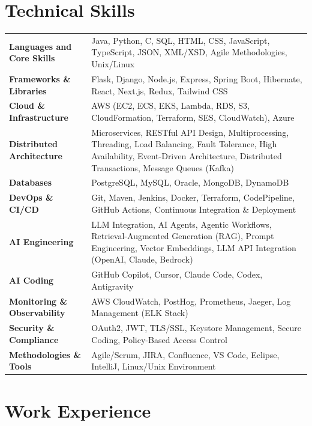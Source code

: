 \documentclass[a4paper,10pt]{article}
\begin{document}
\section{Technical Skills}
\begin{tabular*}{\textwidth}{@{}p{}@{\hspace{1pt}}p{}@{}}
\textbf{Languages and Core Skills} & Java, Python, C, SQL, HTML, CSS, JavaScript, TypeScript, JSON, XML/XSD, Agile Methodologies, Unix/Linux \\
\textbf{Frameworks \& Libraries} & Flask, Django, Node.js, Express, Spring Boot, Hibernate, React, Next.js, Redux, Tailwind CSS \\
\textbf{Cloud \& Infrastructure} & AWS (EC2, ECS, EKS, Lambda, RDS, S3, CloudFormation, Terraform, SES, CloudWatch), Azure \\
\textbf{Distributed Architecture} & Microservices, RESTful API Design, Multiprocessing, Threading, Load Balancing, Fault Tolerance, High Availability, Event-Driven Architecture, Distributed Transactions, Message Queues (Kafka) \\
\textbf{Databases} & PostgreSQL, MySQL, Oracle, MongoDB, DynamoDB \\[-1pt]
\textbf{DevOps \& CI/CD} & Git, Maven, Jenkins, Docker, Terraform, CodePipeline, GitHub Actions, Continuous Integration \& Deployment \\
\textbf{AI Engineering} & LLM Integration, AI Agents, Agentic Workflows, Retrieval-Augmented Generation (RAG), Prompt Engineering, Vector Embeddings, LLM API Integration (OpenAI, Claude, Bedrock)\\
\textbf{AI Coding} & GitHub Copilot, Cursor, Claude Code, Codex, Antigravity \\
\textbf{Monitoring \& Observability} & AWS CloudWatch, PostHog, Prometheus, Jaeger, Log Management (ELK Stack) \\
\textbf{Security \& Compliance} & OAuth2, JWT, TLS/SSL, Keystore Management, Secure Coding, Policy-Based Access Control \\
\textbf{Methodologies \& Tools} & Agile/Scrum, JIRA, Confluence, VS Code, Eclipse, IntelliJ, Linux/Unix Environment \\
\end{tabular*}

\vspace{3pt}
\section{Work Experience}
\end{document}
